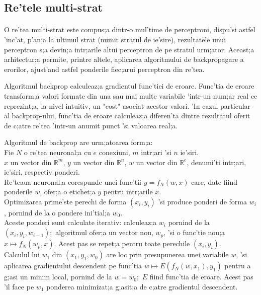 \subsection{Re'tele multi-strat}
\paragraph{}

O re'tea multi-strat este compus;a dintr-o mul'time de perceptroni, dispu'si astfel 'inc'at, p'an;a la ultimul strat (numit stratul de ie'sire), rezultatele unui perceptron s;a devin;a intr;arile altui perceptron de pe stratul urm;ator. Aceast;a arhitectur;a permite, printre altele, aplicarea algoritmului de backpropagare a erorilor, ajust'and astfel ponderile fiec;arui perceptron din re'tea.
\par
Algoritmul backprop calculeaz;a gradientul func'tiei de eroare. Func'tia de eroare transform;a valori formate din una sau mai multe variabile 'intr-un num;ar real ce reprezint;a, la nivel intuitiv, un "cost" asociat acestor valori. 'In cazul particular al backprop-ului, func'tia de eroare calculeaz;a diferen'ta dintre rezultatul oferit de c;atre re'tea 'intr-un anumit punct 'si valoarea real;a.
\par
Algoritmul de backprop are urm;atoarea form;a: \\
Fie $N$ o re'tea neuronal;a cu $e$ conexiuni, $m$ intr;ari 'si $n$ ie'siri. \\
$x$ un vector din $\mathbb{R}^m$, $y$ un vector din $\mathbb{R}^n$, $w$ un vector din $\mathbb{R}^e$, denumi'ti intr;ari, ie'siri, respectiv ponderi. \\
Re'teaua neuronal;a corespunde unei func'tii $y = f_{N}(w, x)$ care, date fiind ponderile $w$, ofer;a o etichet;a $y$ pentru intr;arile $x$. \\
Optimizarea prime'ste perechi de forma $(x_i, y_i)$ 'si produce ponderi de forma $w_i$, pornind de la o pondere ini'tial;a $w_0$. \\
Aceste ponderi sunt calculate iterativ: calculeaz;a $w_i$ pornind de la $(x_i, y_i, w_{i-1})$;\ algoritmul ofer;a un vector nou, $w_p$, 'si o func'tie nou;a $x \mapsto f_N(w_p, x)$. Acest pas se repet;a pentru toate perechile $(x_i, y_i)$. \\
Calculul lui $w_1$ din $(x_1, y_1, w_0)$ are loc prin presupunerea unei variabile $w$, 'si aplicarea gradientului descendent pe func'tia $w \mapsto E(f_N(w, x_1), y_1)$ pentru a g;asi un minim local, pornind de la $w = w_0$;\ $E$ fiind func'tia de eroare. Acest pas 'il face pe $w_1$ ponderea minimizat;a g;asit;a de c;atre gradientul descendent.